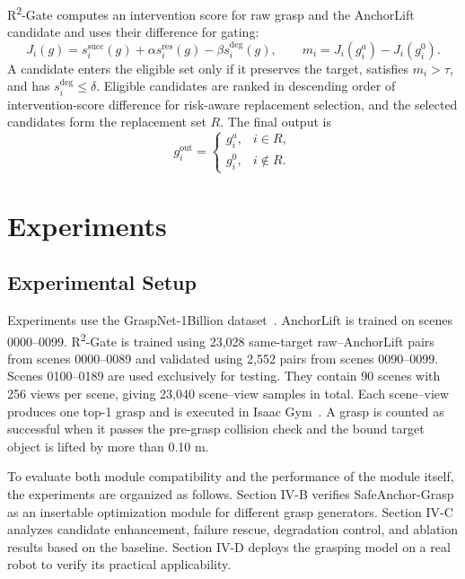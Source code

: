 \documentclass[lettersize,journal]{IEEEtran}
\begin{document}
R\textsuperscript{2}-Gate computes an intervention score for raw grasp and the AnchorLift candidate and uses their difference for gating:
\begin{equation}
J_i(g)=s_i^{\mathrm{succ}}(g)+\alpha s_i^{\mathrm{res}}(g)-\beta s_i^{\mathrm{deg}}(g),
\qquad
m_i=J_i(g_i^a)-J_i(g_i^0).
\tag{7}\label{eq:intervention_margin}
\end{equation}
A candidate enters the eligible set only if it preserves the target, satisfies $m_i>\tau$, and has $s_i^{\mathrm{deg}}\leq\delta$. Eligible candidates are ranked in descending order of intervention-score difference for risk-aware replacement selection, and the selected candidates form the replacement set $R$. The final output is
\begin{equation}
g_i^{\mathrm{out}}
=
\begin{cases}
g_i^a,& i\in R,\\
g_i^0,& i\notin R.
\end{cases}
\tag{8}\label{eq:final_decision}
\end{equation}
\section{Experiments}

\subsection{Experimental Setup}
Experiments use the GraspNet-1Billion dataset~\cite{ref11}. AnchorLift is trained on scenes 0000--0099. R\textsuperscript{2}-Gate is trained using 23,028 same-target raw--AnchorLift pairs from scenes 0000--0089 and validated using 2,552 pairs from scenes 0090--0099. Scenes 0100--0189 are used exclusively for testing. They contain 90 scenes with 256 views per scene, giving 23,040 scene--view samples in total. Each scene--view produces one top-1 grasp and is executed in Isaac Gym~\cite{ref32}. A grasp is counted as successful when it passes the pre-grasp collision check and the bound target object is lifted by more than 0.10 m.

To evaluate both module compatibility and the performance of the module itself, the experiments are organized as follows. Section IV-B verifies SafeAnchor-Grasp as an insertable optimization module for different grasp generators. Section IV-C analyzes candidate enhancement, failure rescue, degradation control, and ablation results based on the baseline. Section IV-D deploys the grasping model on a real robot to verify its practical applicability.
\end{document}
